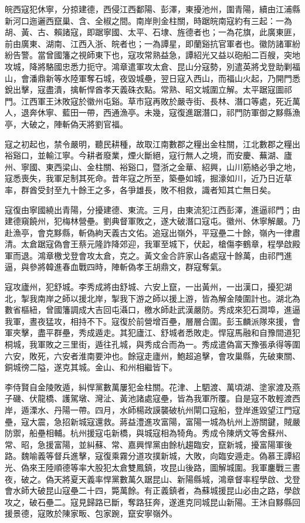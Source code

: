 \begin{pinyinscope}
皖西寇犯休寧，分掠建德，西侵江西鄱陽、彭澤，東擾池州，圍青陽，續由江浦縣新河口迤邐西竄巢、含、全椒之間。南岸則金柱關，時踞皖南寇約有三起：一為胡、黃、古、賴諸寇，即踞寧國、太平、石埭、旌德者也；一為花旗，此廣東匪，前由廣東、湖南、江西入浙、皖者也；一為譚星，即蘭谿抗官軍者也。徽防諸軍紛紛告警。當曾國籓之視師東下也，寇攻常熟益急，譚紹光又益以砲船二百艘，突地攻城，降將駱國忠悉力扼守。鴻章遣軍攻太倉、昆山分寇勢，別遣英將戈登助剿福山，會潘鼎新等水陸軍奪石城，夜毀城壘，翌日寇入西山，而福山火起，乃開門悉銳出擊，寇盡潰，擒斬悍酋孝天義硃衣點。常熟、昭文城圍立解。太平踞寇圖祁門。江西軍王沐敗寇於徽州屯谿。草市寇再敗於嚴寺街、長林、潛口等處，死近萬人，退奔休寧、藍田一帶，西通漁亭。未幾，寇復進踞潛口，祁門防軍御之黟縣漁亭，大破之，陣斬偽天將劉官福。

寇之初起也，禁令嚴明，聽民耕種，故取江南數郡之糧出金柱關，江北數郡之糧出裕谿口，並輸江寧。今耕者廢業，煙火斷絕，寇行無人之境，而安慶、蕪湖、廬州、寧國、東西梁山、金柱關、裕谿口，暨浙之金華、紹興，山川筋絡必爭之地，寇悉喪失，我軍足制其死命。昔年寇之所至，築壘如城，掘濠如川，近乃日近草率，群酋受封至九十餘王之多，各爭雄長，敗不相救，識者知其亡無日矣。

寇復由寧國繞出青陽，分擾建德、東流。三月，由東流犯江西彭澤，進逼祁門；由建德窺饒州，犯梅林營壘。劉典督軍敗之，遂大破潛口寇屯。徽州、休寧解嚴。乃赴漁亭，會克黟縣，斬偽絇天義古文佑。追寇出嶺外，平寇壘二十餘，嶺內一律肅清。太倉踞寇偽會王蔡元隆詐降郊迎，我軍至城下，伏起，槍傷李鶴章，程學啟殿軍而退。鴻章檄戈登會攻太倉，克之。黃文金合許家山各處寇十餘萬，由祁門進逼，與參將韓進春血戰四時，陣斬偽孝王胡鼎文，群寇奪氣。

寇攻廬州，犯舒城。李秀成將由舒城、六安上竄，一出黃州，一出漢口，擾犯湖北，掣我南岸之師以援北岸，掣我下游之師以援上游，皆為解金陵圍計也。湖北為數省樞紐，曾國籓調成大吉回屯灄口，檄水師赴武漢嚴防。秀成來犯石澗埠，進逼我軍，晝夜猛攻，相持不下。寇復於前營增百壘，層層合圍。彭玉麟派隊來援，會軍夾擊，盡平群壘，秀成遁走。其犯廬江、舒城者悉敗走。悍寇馬融和自豫間道犯桐城，我軍敗之三里街，遁往孔城，與秀成合而為一。秀成遣偽富天豫張承得等圍六安，敗死，六安者淮南要沖也。餘寇走廬州，鮑超追擊，會攻巢縣，先破東關、銅城徬二隘，遂克其城。金山、和州相繼皆下。

李侍賢自金陵敗遁，糾悍黨數萬屢犯金柱關。花津、上駟渡、萬頃湖、塗家渡及燕子磯、伏龍橋、護駕墩、灣沚、黃池諸處寇壘，皆為我軍所覆。自是寇不敢輕渡西岸，遁溧水、丹陽一帶。四月，水師楊政謨襲破杭州閘口寇船，登岸進毀望江門寇壘，寇大震，急招新城寇還救。蔣益澧進攻富陽，富陽一城為杭州上游關鍵，賊嚴防禦，船壘相輔。杭州援寇屯新橋，與城寇相為犄角。秀成令陳炳文等舍蘇州、常、昭，急援富陽，並糾蘇、常、嘉興悍黨由餘杭趨臨安，竄新城，擾富陽軍後路。魏喻義等督兵進擊，寇復乘霧分道攻撲新城，大敗，向臨安遁走。偽慕王譚紹光、偽來王陸順德等率大股犯太倉雙鳳鎮，攻昆山後路，圖解城圍。我軍鏖戰三晝夜，破之。偽天將夏天義率悍黨數萬久踞昆山、新陽縣城，鴻章督率程學啟、戈登會水師大破昆山寇壘二十四，斃萬餘。有正義鎮者，為蘇城援昆山必由之路，學啟攻之，破石壘二。寇見歸路已斷，奪路狂奔，遂進克同城昆山新陽。王沐自黟縣回援景德，寇敗於陳家畈、包家踠，竄安寧嶺外。


\end{pinyinscope}
